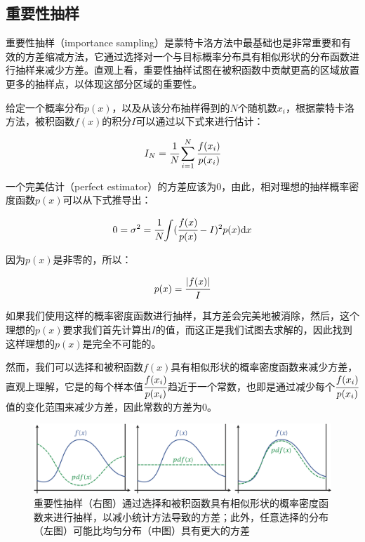 \subsection{重要性抽样}
重要性抽样（importance sampling）是蒙特卡洛方法中最基础也是非常重要和有效的方差缩减方法，它通过选择对一个与目标概率分布具有相似形状的分布函数进行抽样来减少方差。直观上看，重要性抽样试图在被积函数中贡献更高的区域放置更多的抽样点，以体现这部分区域的重要性。

给定一个概率分布$p(x)$，以及从该分布抽样得到的$N$个随机数$x_i$，根据蒙特卡洛方法，被积函数$f(x)$的积分$I$可以通过以下式来进行估计：

\begin{equation}
	I_N= \cfrac{1}{N}\sum_{i=1}^{N} \cfrac{f(x_i)}{p(x_i)}
\end{equation}

\noindent 一个完美估计（perfect estimator）的方差应该为0，由此，相对理想的抽样概率密度函数$p(x)$可以从下式推导出：

\begin{equation}
	0=\sigma^2= \cfrac{1}{N}{\rm \int}( \cfrac{f(x)}{p(x)}-I)^2p(x){\rm d}x
\end{equation}

\noindent 因为$p(x)$是非零的，所以：

\begin{equation}
	p(x)= \cfrac{|f(x)|}{I}
\end{equation}

\noindent 如果我们使用这样的概率密度函数进行抽样，其方差会完美地被消除，然后，这个理想的$p(x)$要求我们首先计算出$I$的值，而这正是我们试图去求解的，因此找到这样理想的$p(x)$是完全不可能的。

然而，我们可以选择和被积函数$f(x)$具有相似形状的概率密度函数来减少方差，直观上理解，它是的每个样本值$ \cfrac{f(x_i)}{p(x_i)}$趋近于一个常数，也即是通过减少每个$ \cfrac{f(x_i)}{p(x_i)}$值的变化范围来减少方差，因此常数的方差为0。

\begin{figure}
	\includegraphics[width=1.0\textwidth]{figures/mc/mc-11}
	\caption{重要性抽样（右图）通过选择和被积函数具有相似形状的概率密度函数来进行抽样，以减小统计方法导致的方差；此外，任意选择的分布（左图）可能比均匀分布（中图）具有更大的方差}
	\label{f:mc-importance-sampling}
\end{figure}

